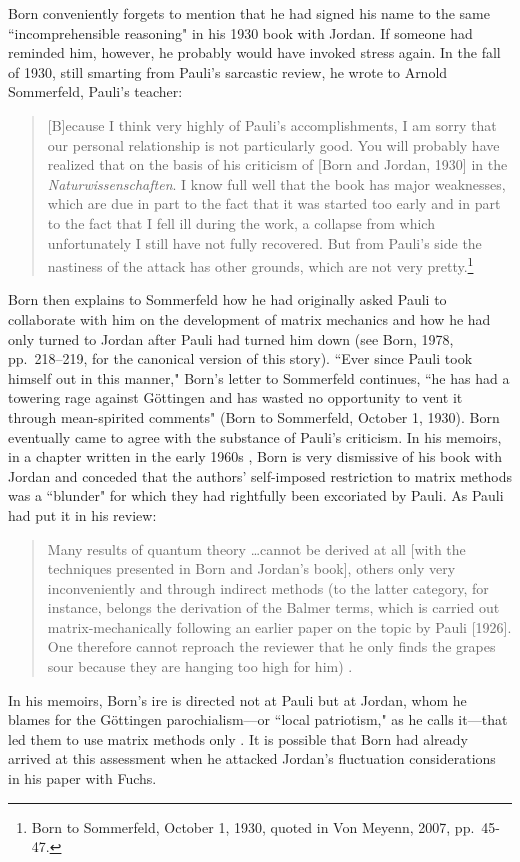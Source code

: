 \documentclass{elsart}
\begin{document}
Born conveniently forgets to mention that he had signed his name to the same ``incomprehensible reasoning" in his 1930 book with Jordan. If someone had reminded him, however, he probably would have invoked stress again. In the fall of 1930, still smarting from Pauli's sarcastic review, he wrote to Arnold Sommerfeld, Pauli's teacher:
\begin{quotation}
[B]ecause I think very highly of Pauli's accomplishments, I am sorry that our personal relationship is not particularly good. You will probably have realized that on the basis of his criticism of  [Born and Jordan, 1930] in the {\it Naturwissenschaften}. I know full well that the book has major weaknesses, which are due in part to the fact that it was started too early and in part to the fact that I fell ill during the work, a collapse from which unfortunately I still have not fully recovered. But from Pauli's side the nastiness of the attack has other grounds, which are not very pretty.\footnote{Born to Sommerfeld, October 1, 1930, quoted in Von Meyenn, 2007, pp.\ 45-47.}
\end{quotation}
Born then explains to Sommerfeld how he had originally asked Pauli to collaborate with him on the development of matrix mechanics and how he had only turned to Jordan after Pauli had turned him down (see Born, 1978, pp.\ 218--219, for the canonical version of this story). ``Ever since Pauli took himself out in this manner," Born's letter to Sommerfeld continues, ``he has had a towering rage against G\"ottingen and has wasted no opportunity to vent it through mean-spirited comments" (Born to Sommerfeld, October 1, 1930). Born eventually came to agree with the substance of Pauli's criticism.
In his memoirs, in a chapter written in the early 1960s  \citep[p.\ 225]{Born 1978}, Born is very dismissive of his book with Jordan and conceded that the authors' self-imposed restriction to matrix methods was a ``blunder" for which they had rightfully been excoriated by Pauli. As Pauli had put it in his review:
\begin{quotation}
Many results of quantum theory \ldots cannot be derived at all [with the techniques presented in Born and Jordan's book], others only very inconveniently and through indirect methods (to the latter category, for instance, belongs the derivation of the Balmer terms, which is carried out matrix-mechanically following an earlier paper on the topic by Pauli [1926]. One therefore cannot reproach the reviewer that he only finds the grapes sour because they are hanging too high for him) \citep{Pauli 1930}.
\end{quotation}
In his memoirs, Born's ire is directed not at Pauli but at Jordan, whom he blames for the G\"ottingen parochialism---or ``local patriotism," as he calls it---that led them to use matrix methods only \citep[p.\ 230]{Born 1978}. It is possible that Born had already arrived at this assessment when he attacked Jordan's fluctuation considerations in his paper with Fuchs. 
\end{document}
